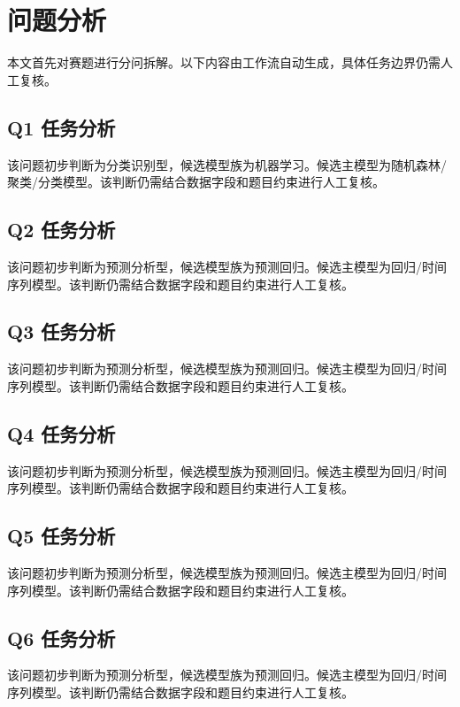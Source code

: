 \section{问题分析}

本文首先对赛题进行分问拆解。以下内容由工作流自动生成，具体任务边界仍需人工复核。

\subsection{Q1 任务分析}
该问题初步判断为分类识别型，候选模型族为机器学习。候选主模型为随机森林/聚类/分类模型。该判断仍需结合数据字段和题目约束进行人工复核。

\subsection{Q2 任务分析}
该问题初步判断为预测分析型，候选模型族为预测回归。候选主模型为回归/时间序列模型。该判断仍需结合数据字段和题目约束进行人工复核。

\subsection{Q3 任务分析}
该问题初步判断为预测分析型，候选模型族为预测回归。候选主模型为回归/时间序列模型。该判断仍需结合数据字段和题目约束进行人工复核。

\subsection{Q4 任务分析}
该问题初步判断为预测分析型，候选模型族为预测回归。候选主模型为回归/时间序列模型。该判断仍需结合数据字段和题目约束进行人工复核。

\subsection{Q5 任务分析}
该问题初步判断为预测分析型，候选模型族为预测回归。候选主模型为回归/时间序列模型。该判断仍需结合数据字段和题目约束进行人工复核。

\subsection{Q6 任务分析}
该问题初步判断为预测分析型，候选模型族为预测回归。候选主模型为回归/时间序列模型。该判断仍需结合数据字段和题目约束进行人工复核。

